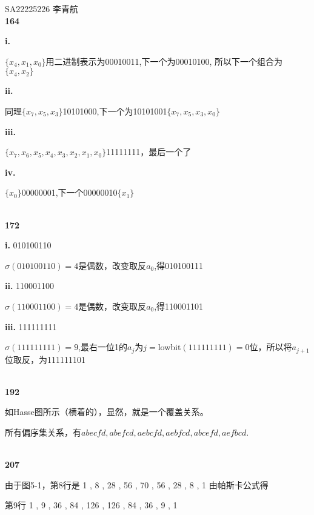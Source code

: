 \documentclass[UTF8]{ctexart}
\begin{document}
SA22225226 李青航
~\\
\noindent\textbf{164}

\textbf{i. }

$\{x_4,x_1,x_0\}$用二进制表示为00010011,下一个为00010100,
所以下一个组合为$\{x_4,x_2\}$

\textbf{ii. }

同理$\{x_7,x_5,x_3\}$10101000,下一个为10101001$\{x_7,x_5,x_3,x_0\}$

\textbf{iii. }

$\{x_7,x_6,x_5,x_4,x_3,x_2,x_1,x_0\}$11111111，最后一个了

\textbf{iv. }

$\{x_0\}$00000001,下一个00000010$\{x_1\}$

~\\
\noindent\textbf{172}

\textbf{i. }010100110

$\sigma(010100110)=4$是偶数，改变取反$a_0$,得010100111

\textbf{ii. }110001100

$\sigma(110001100)=4$是偶数，改变取反$a_0$,得110001101

\textbf{iii. }111111111

$\sigma(111111111)=9$,最右一位1的$a_j$为$j=$lowbit$(111111111)=0$位，所以将$a_{j+1}$
位取反，为111111101

~\\
\noindent\textbf{192}


如Hasse图所示（横着的），显然，就是一个覆盖关系。

所有偏序集关系，有$abecfd, abefcd, aebcfd, aebfcd, abcefd, aefbcd.$

~\\
\noindent\textbf{207}

由于图5-1，第8行是 1    ,   8    ,   28   ,   56    ,  70   ,   56   ,   28   ,   8   ,    1
由帕斯卡公式得

第9行  1  ,     9    ,   36  ,    84   ,   126  ,   126   ,  84  ,    36  ,    9    ,   1
\end{document}
